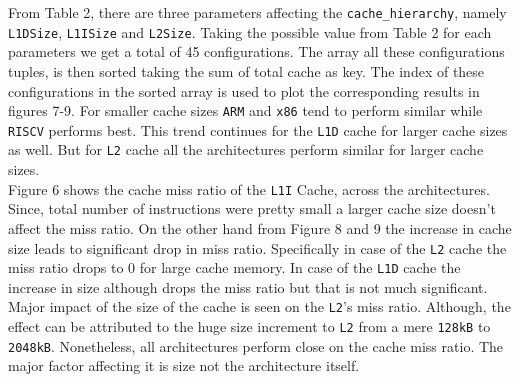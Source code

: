 From Table 2, there are three parameters affecting the \texttt{cache\_hierarchy},
namely \texttt{L1DSize}, \texttt{L1ISize} and \texttt{L2Size}. Taking the possible value from Table 2 for
each parameters we get a total of 45 configurations. The array all these configurations tuples, is then sorted
taking the sum of total cache as key. The index of these configurations in the sorted array is used to plot
the corresponding results in figures 7-9. For smaller cache sizes \texttt{ARM} and \texttt{x86} tend to perform
similar while \texttt{RISCV} performs best. This trend continues for the \texttt{L1D} cache for larger
cache sizes as well. But for \texttt{L2} cache all the architectures perform similar for larger cache sizes.\\
Figure 6 shows the cache miss ratio of the \texttt{L1I} Cache, across the architectures. Since, total number of
instructions were pretty small a larger cache size doesn't affect the miss ratio. On the other hand from Figure
8 and 9 the increase in cache size leads to significant drop in miss ratio. Specifically in case of the \texttt{L2}
cache the miss ratio drops to 0 for large cache memory. In case of the \texttt{L1D} cache the increase in
size although drops the miss ratio but that is not much significant. Major impact of the size of the cache
is seen on the \texttt{L2}'s miss ratio. Although, the effect can be attributed to the huge size increment
to \texttt{L2} from a mere \texttt{128kB} to \texttt{2048kB}. Nonetheless, all architectures perform close on
the cache miss ratio. The major factor affecting it is size not the architecture itself.